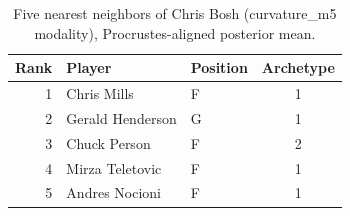 \begin{table}[htbp]
  \centering\small
  \begin{tabular}{rllc}
    \toprule
    Rank & Player & Position & Archetype \\
    \midrule
    1 & Chris Mills & F & 1 \\
    2 & Gerald Henderson & G & 1 \\
    3 & Chuck Person & F & 2 \\
    4 & Mirza Teletovic & F & 1 \\
    5 & Andres Nocioni & F & 1 \\
    \bottomrule
  \end{tabular}
  \caption{Five nearest neighbors of Chris Bosh (curvature_m5 modality), Procrustes-aligned posterior mean.}
  \label{tab:Chris_Bosh_neighbors_curvature_m5}
\end{table}

